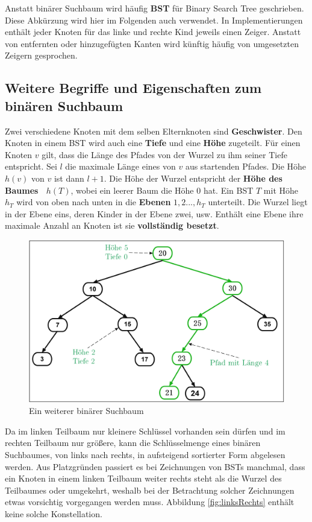 \documentclass[a4paper,12pt]{article}
\begin{document}
\noindent Anstatt binärer Suchbaum wird häufig \textbf{BST} für Binary Search Tree geschrieben. Diese Abkürzung wird hier im Folgenden auch verwendet. In Implementierungen enthält jeder Knoten für das linke und rechte Kind jeweils einen Zeiger. Anstatt von entfernten oder hinzugefügten Kanten wird künftig häufig von umgesetzten Zeigern gesprochen. 	
\subsection{Weitere Begriffe und Eigenschaften zum binären Suchbaum}	
\noindent Zwei verschiedene Knoten mit dem selben Elternknoten sind \textbf{Geschwister}. Den Knoten in einem BST wird auch eine \textbf{Tiefe} und eine \textbf{Höhe} zugeteilt. Für einen Knoten $v$ gilt, dass die Länge des Pfades von der Wurzel zu ihm seiner Tiefe entspricht. Sei $l$ die maximale Länge eines von $v$ aus startenden Pfades. Die Höhe $\mathit{h(v)}$ von $v$ ist dann $l+1$. Die Höhe der Wurzel entspricht der \textbf{Höhe des Baumes~ $h(T)$}, wobei ein leerer Baum die Höhe $0$ hat. Ein BST $T$ mit Höhe $h_T$ wird von oben nach unten in die \textbf{Ebenen} $\mathit{1,2...,h_T}$ unterteilt. Die Wurzel liegt in der Ebene eins, deren Kinder in der Ebene zwei, usw. Enthält eine Ebene ihre maximale Anzahl an Knoten ist sie \textbf{vollständig besetzt}.
\begin{figure}[H]
	\centering
	\includegraphics[width= 1\textwidth]{"Medien/Einleitung/suchbaum2_2"}
	\caption{Ein weiterer binärer Suchbaum }
	\label{fig:suchbaum2_2}
\end{figure}

\noindent Da im linken Teilbaum nur kleinere Schlüssel vorhanden sein dürfen und im rechten Teilbaum nur größere, kann die Schlüsselmenge eines binären Suchbaumes, von links nach rechts, in aufsteigend sortierter Form abgelesen werden. Aus Platzgründen passiert es bei Zeichnungen von BSTs manchmal, dass ein Knoten in einem linken Teilbaum weiter rechts steht als die Wurzel des Teilbaumes oder umgekehrt, weshalb bei der Betrachtung solcher Zeichnungen etwas vorsichtig vorgegangen werden muss. Abbildung \ref{fig:linksRechts} enthält keine solche Konstellation.  
\end{document}
